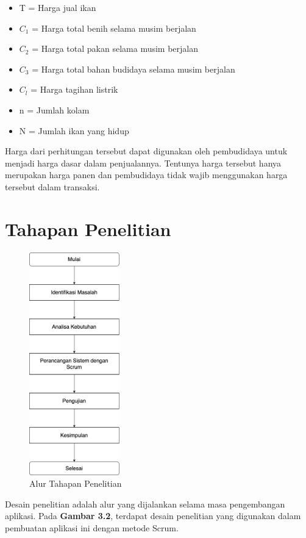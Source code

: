 \begin{itemize}
	\item T = Harga jual ikan
	\item $C_1$ = Harga total benih selama musim berjalan
	\item $C_2$ = Harga total pakan selama musim berjalan
	\item $C_3$ = Harga total bahan budidaya selama musim berjalan
	\item $C_l$ = Harga tagihan listrik
	\item n = Jumlah kolam
	\item N = Jumlah ikan yang hidup
\end{itemize}

Harga dari perhitungan tersebut dapat digunakan oleh pembudidaya untuk menjadi harga dasar dalam penjualannya. Tentunya harga tersebut hanya merupakan harga panen dan pembudidaya tidak wajib menggunakan harga tersebut dalam transaksi.

\section{Tahapan Penelitian}

\begin{figure}[H]
	\centering
	\includegraphics[width=0.35\textwidth]{gambar/tahapan_penelitian.png}
	\caption{Alur Tahapan Penelitian}
\end{figure}

Desain penelitian adalah alur yang dijalankan selama masa pengembangan aplikasi. Pada \textbf{Gambar 3.2}, terdapat desain penelitian yang digunakan dalam pembuatan aplikasi ini dengan metode Scrum.

